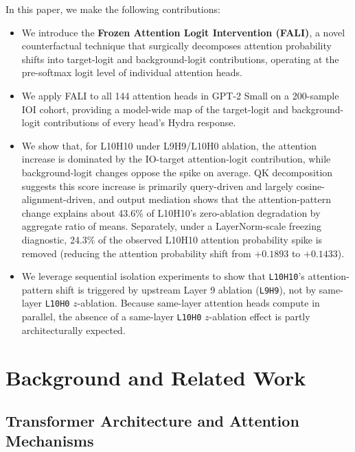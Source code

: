 \documentclass[12pt,a4paper]{article}
\begin{document}
In this paper, we make the following contributions:

\begin{itemize}
  \item We introduce the \textbf{Frozen Attention Logit Intervention (FALI)}, a
    novel counterfactual technique that surgically decomposes attention probability shifts into
    target-logit and background-logit contributions, operating at the pre-softmax
    logit level of individual attention heads.
  \item We apply FALI to all 144 attention heads in GPT-2 Small on a
    200-sample IOI cohort, providing a model-wide map of the target-logit and background-logit
    contributions of every head's Hydra response.
  \item We show that, for L10H10 under L9H9/L10H0 ablation, the attention increase is dominated by the IO-target attention-logit contribution, while background-logit changes oppose the spike on average. QK decomposition suggests this score increase is primarily query-driven and largely cosine-alignment-driven, and output mediation shows that the attention-pattern change explains about 43.6\% of L10H10's zero-ablation degradation by aggregate ratio of means. Separately, under a LayerNorm-scale freezing diagnostic, 24.3\% of the observed L10H10 attention probability spike is removed (reducing the attention probability shift from $+0.1893$ to $+0.1433$).
  \item We leverage sequential isolation experiments to show that \texttt{L10H10}'s attention-pattern shift is triggered by upstream Layer 9 ablation (\texttt{L9H9}), not by same-layer \texttt{L10H0} $z$-ablation. Because same-layer attention heads compute in parallel, the absence of a same-layer \texttt{L10H0} $z$-ablation effect is partly architecturally expected.
\end{itemize}

\section{Background and Related Work}
\label{sec:background}

\subsection{Transformer Architecture and Attention Mechanisms}
\end{document}
